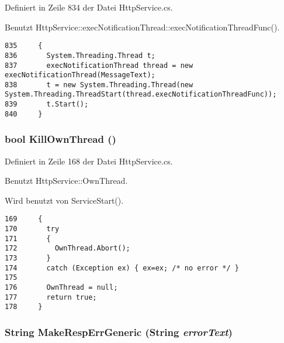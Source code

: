 Definiert in Zeile 834 der Datei Http\-Service.cs.

Benutzt Http\-Service::exec\-Notification\-Thread::exec\-Notification\-Thread\-Func().



\footnotesize\begin{verbatim}835     {
836       System.Threading.Thread t;
837       execNotificationThread thread = new execNotificationThread(MessageText);
838       t = new System.Threading.Thread(new System.Threading.ThreadStart(thread.execNotificationThreadFunc));
839       t.Start();
840     }
\end{verbatim}\normalsize 
\hypertarget{classQbeSAS_1_1HttpService_QbeSAS_1_1HttpServicea2}{
\subsubsection[KillOwnThread]{\setlength{\rightskip}{0pt plus 5cm}bool Kill\-Own\-Thread ()}}
\label{classQbeSAS_1_1HttpService_QbeSAS_1_1HttpServicea2}




Definiert in Zeile 168 der Datei Http\-Service.cs.

Benutzt Http\-Service::Own\-Thread.

Wird benutzt von Service\-Start().



\footnotesize\begin{verbatim}169     {
170       try 
171       {
172         OwnThread.Abort();
173       } 
174       catch (Exception ex) { ex=ex; /* no error */ }
175 
176       OwnThread = null;
177       return true;
178     }
\end{verbatim}\normalsize 
\hypertarget{classQbeSAS_1_1HttpService_QbeSAS_1_1HttpServiced3}{
\subsubsection[MakeRespErrGeneric]{\setlength{\rightskip}{0pt plus 5cm}String Make\-Resp\-Err\-Generic (String {\em error\-Text})}}
\label{classQbeSAS_1_1HttpService_QbeSAS_1_1HttpServiced3}


